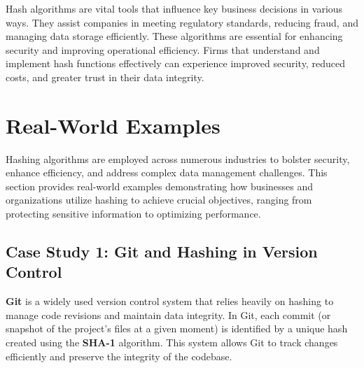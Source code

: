 \documentclass[11pt,a4paper]{article}
\begin{document}
    Hash algorithms are vital tools that influence key business decisions in various ways. They assist companies in meeting regulatory standards, reducing fraud, and managing data storage efficiently. These algorithms are essential for enhancing security and improving operational efficiency. Firms that understand and implement hash functions effectively can experience improved security, reduced costs, and greater trust in their data integrity.

\section*{Real-World Examples}
Hashing algorithms are employed across numerous industries to bolster security, enhance efficiency, and address complex data management challenges. This section provides real-world examples demonstrating how businesses and organizations utilize hashing to achieve crucial objectives, ranging from protecting sensitive information to optimizing performance.

    \subsection*{Case Study 1: Git and Hashing in Version Control}
    \textbf{Git} is a widely used version control system that relies heavily on hashing to manage code revisions and maintain data integrity. In Git, each commit (or snapshot of the project’s files at a given moment) is identified by a unique hash created using the \textbf{SHA-1} algorithm. This system allows Git to track changes efficiently and preserve the integrity of the codebase.
\end{document}
